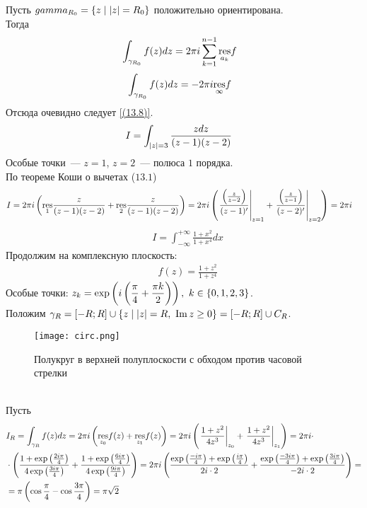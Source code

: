 Пусть $gamma_{R_0} = \{z \mid \left|{z}\right| = R_0\}$ положительно ориентирована.
\\
Тогда
\begin{align*}
  & \int_{\gamma_{R_0}}f(z)dz = 2 \pi i \sum_{k=1}^{n-1} \underset{a_k}{\mathrm{res}}f
\end{align*}
\begin{align*}
  & \int_{\gamma_{R_0}}f(z)dz = -2 \pi i \underset{\infty}{\mathrm{res}}f
\end{align*}
Отсюда очевидно следует \eqref{(13.8)}.
\Example
\begin{align*}
  & I = \int_{\left|{z}\right| = 3}\frac{z dz}{(z-1)(z-2)}
\end{align*}
Особые точки~--- $z=1$, $z=2$~--- полюса $1$ порядка.
\\
По теореме Коши о вычетах ($13.1$)
\begin{align*}
  & I = 2 \pi i \left( \underset{1}{\mathrm{res}} \frac{z}{(z-1)(z-2)} +  \underset{2}{\mathrm{res}} \frac{z}{(z-1)(z-2)}\right) = 2 \pi i \left( \left. \frac{\left( \frac{z}{z-2} \right)}{(z-1)'} \right|_{z=1} +  \left. \frac{\left( \frac{z}{z-1} \right)}{(z-2)'} \right|_{z=2} \right) = 2 \pi i
\end{align*}
\Example
\begin{align*}
  & I = \int_{-\infty}^{+\infty}\frac{1+x^2}{1+x^4}dx
\end{align*}
Продолжим на комплексную плоскость:
\begin{align*}
  & f(z) = \frac{1+z^2}{1+z^4}
\end{align*}
Особые точки: $z_k = \exp \left( i \left( \displaystyle \frac{\pi}{4} + \displaystyle \frac{\pi
          k}{2} \right) \right), \ k \in\{0, 1, 2, 3\}$.
\\
Положим $\gamma_R = \left[ -R;R \right] \cup \{z \mid \left|{z}\right| = R, \ \mathrm{Im}\, z \geq
0 \} = \left[ -R;R \right] \cup C_R$.
\begin{figure}[h!]
		\centering
		\texttt{[image: circ.png]}
    \caption{Полукруг в верхней полуплоскости с обходом против часовой стрелки}
		\label{fig:13.1}
\end{figure}
\\
Пусть 
\begin{align*}
  & I_R = \int_{\gamma_R}f(z)dz = 2 \pi i \left( \underset{z_0}{\mathrm{res}} f(z) +  \underset{z_1}{\mathrm{res}} f(z)\right) = 2 \pi i \left( \left.\frac{1+z^2}{4z^3}\right|_{z_0} + \left.\frac{1+z^2}{4z^3}\right|_{z_1}\right) = 2 \pi i \cdot \\
  & \cdot \left( \frac{1+\exp\left( \frac{2i \pi}{4} \right)}{4 \exp \left( \frac{3i \pi}{4} \right)} +  \frac{1+\exp\left( \frac{6i \pi}{4} \right)}{4 \exp \left( \frac{9i \pi}{4} \right)}\right) = 2 \pi i \left( \frac{\exp\left( \frac{-i\pi}{4} \right) + \exp\left( \frac{i\pi}{4} \right)}{2 i \cdot 2} +  \frac{\exp\left( \frac{-3i\pi}{4} \right) + \exp\left( \frac{3i\pi}{4} \right)}{-2 i \cdot 2}\right) = \\
  & = \pi \left( \cos \frac{\pi}{4} - \cos \frac{3\pi}{4} \right) = \pi \sqrt{2}
\end{align*}
